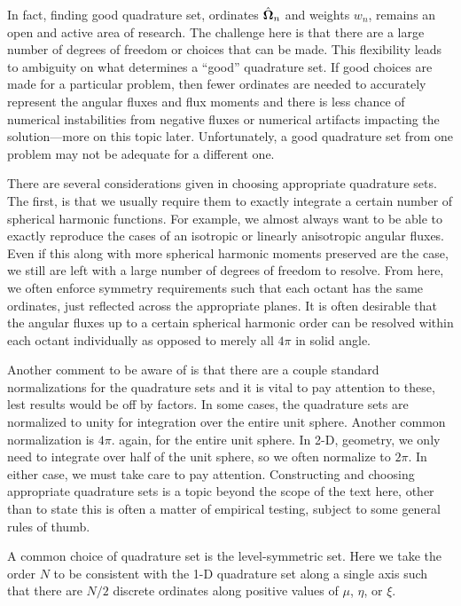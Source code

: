 In fact, finding good quadrature set, ordinates $\hat{\mathbf{\Omega}}_n$ and weights $w_n$, remains an open and active area of research. The challenge here is that there are a large number of degrees of freedom or choices that can be made. This flexibility leads to ambiguity on what determines a ``good'' quadrature set. If good choices are made for a particular problem, then fewer ordinates are needed to accurately represent the angular fluxes and flux moments and there is less chance of numerical instabilities from negative fluxes or numerical artifacts impacting the solution---more on this topic later. Unfortunately, a good quadrature set from one problem may not be adequate for a different one.

There are several considerations given in choosing appropriate quadrature sets. The first, is that we usually require them to exactly integrate a certain number of spherical harmonic functions. For example, we almost always want to be able to exactly reproduce the cases of an isotropic or linearly anisotropic angular fluxes. Even if this along with more spherical harmonic moments preserved are the case, we still are left with a large number of degrees of freedom to resolve. From here, we often enforce symmetry requirements such that each octant has the same ordinates, just reflected across the appropriate planes. It is often desirable that the angular fluxes up to a certain spherical harmonic order can be resolved within each octant individually as opposed to merely all $4\pi$ in solid angle.

Another comment to be aware of is that there are a couple standard normalizations for the quadrature sets and it is vital to pay attention to these, lest results would be off by factors. In some cases, the quadrature sets are normalized to unity for integration over the entire unit sphere. Another common normalization is $4\pi$.
again, for the entire unit sphere. In 2-D, geometry, we only need to integrate over half of the unit sphere, so we often normalize to $2\pi$. In either case, we must take care to pay attention. Constructing and choosing appropriate quadrature sets is a topic beyond the scope of the text here, other than to state this is often a matter of empirical testing, subject to some general rules of thumb. 

A common choice of quadrature set is the level-symmetric set. Here we take the order $N$ to be consistent with the 1-D quadrature set along a single axis such that there are $N/2$ discrete ordinates along positive values of $\mu$, $\eta$, or $\xi$.

